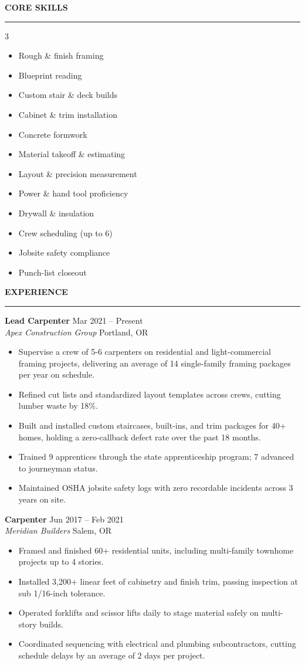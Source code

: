 \documentclass[10pt]{article}
\newcommand{\sectionrule}[1]{%
  \vspace{2pt}
  {\color{primary}\bfseries\large #1}\\[-4pt]
  {\color{accent}\rule{\linewidth}{1.3pt}}
  \vspace{0pt}
}
\newcommand{\jobentry}[4]{%
  \vspace{1pt}
  \textbf{\color{primary}#1} \hfill {\color{graytext}\small #4}\\
  \textit{\color{accent}#2} \hfill {\color{graytext}\small #3}\\[0pt]
}
\begin{document}
\sectionrule{CORE SKILLS}
\begin{multicols}{3}
\begin{itemize}
  \item Rough \& finish framing
  \item Blueprint reading
  \item Custom stair \& deck builds
  \item Cabinet \& trim installation
  \item Concrete formwork
  \item Material takeoff \& estimating
  \item Layout \& precision measurement
  \item Power \& hand tool proficiency
  \item Drywall \& insulation
  \item Crew scheduling (up to 6)
  \item Jobsite safety compliance
  \item Punch-list closeout
\end{itemize}
\end{multicols}

\sectionrule{EXPERIENCE}

\jobentry{Lead Carpenter}{Apex Construction Group}{Portland, OR}{Mar 2021 -- Present}
\begin{itemize}
  \item Supervise a crew of 5-6 carpenters on residential and light-commercial framing projects, delivering an average of 14 single-family framing packages per year on schedule.
  \item Refined cut lists and standardized layout templates across crews, cutting lumber waste by 18\%.
  \item Built and installed custom staircases, built-ins, and trim packages for 40+ homes, holding a zero-callback defect rate over the past 18 months.
  \item Trained 9 apprentices through the state apprenticeship program; 7 advanced to journeyman status.
  \item Maintained OSHA jobsite safety logs with zero recordable incidents across 3 years on site.
\end{itemize}

\jobentry{Carpenter}{Meridian Builders}{Salem, OR}{Jun 2017 -- Feb 2021}
\begin{itemize}
  \item Framed and finished 60+ residential units, including multi-family townhome projects up to 4 stories.
  \item Installed 3,200+ linear feet of cabinetry and finish trim, passing inspection at sub 1/16-inch tolerance.
  \item Operated forklifts and scissor lifts daily to stage material safely on multi-story builds.
  \item Coordinated sequencing with electrical and plumbing subcontractors, cutting schedule delays by an average of 2 days per project.
\end{itemize}
\end{document}
